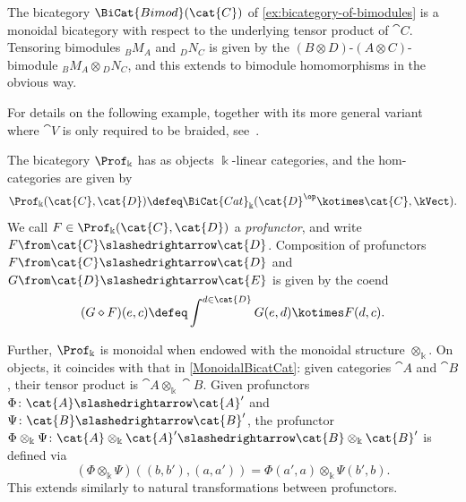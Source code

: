 \begin{example}\label{ex:bimod}
  The bicategory \(\BiCat{Bimod}(\cat{C})\) of \cref{ex:bicategory-of-bimodules}
  is a monoidal bicategory with respect to the underlying tensor product of \(\cat{C}\).
  Tensoring bimodules \({}_{B}M_{A}\) and \({}_{D}N_{C}\) is given by
  the \((B \otimes D)\)\hyp{}\((A \otimes C)\)\hyp{}bimodule
  \({}_{B}M_{A} \otimes {}_{D}N_{C}\),
  and this extends to bimodule homomorphisms in the obvious way.
\end{example}


For details on the following example,
together with its more general variant where \(\cat{V}\) is only required to be braided,
see~\cite[Section~7]{day97:monoid-hopf}.

\begin{example}\label{MonoidalBicatProf}
  The bicategory \(\Prof_{\Bbbk}\) has as objects \(\Bbbk\)\hyp{}linear categories,
  and the hom-categories are given by
  \[
    \Prof_{\Bbbk}(\cat{C}, \cat{D}) \defeq \BiCat{Cat}_{\Bbbk}(\cat{D}^{\op} \kotimes \cat{C}, \kVect).
  \]
  We call \(F \in \Prof_{\Bbbk}(\cat{C}, \cat{D})\) a \emph{profunctor},
  and write \(F \from \cat{C} \slashedrightarrow \cat{D}\).
  Composition of profunctors \(F\from \cat{C} \slashedrightarrow \cat{D}\) and \(G\from \cat{D} \slashedrightarrow \cat{E}\) is given by the coend
  \[
    (G \diamond F)(e, c) \defeq \int^{d \in \cat{D}} G(e, d) \kotimes F(d, c).
  \]

  Further, \(\Prof_{\Bbbk}\) is monoidal when endowed with the monoidal structure \(\otimes_{\Bbbk}\).
  On objects, it coincides with that in \cref{MonoidalBicatCat}:
  given categories \(\cat{A}\) and \(\cat{B}\),
  their tensor product is \(\cat{A} \otimes_{\Bbbk} \cat{B}\).
  Given profunctors \(\Phi\colon \cat{A} \slashedrightarrow \cat{A}'\) and \(\Psi\colon \cat{B} \slashedrightarrow \cat{B}'\),
  the profunctor \(\Phi \otimes_{\Bbbk} \Psi\colon \cat{A} \otimes_{\Bbbk} \cat{A}' \slashedrightarrow \cat{B} \otimes_{\Bbbk} \cat{B}'\)
  is defined via
  \[
    (\Phi \otimes_{\Bbbk} \Psi)((b, b'),(a, a')) = \Phi(a', a) \otimes_{\Bbbk} \Psi(b', b).
  \]
  This extends similarly to natural transformations between profunctors.
\end{example}


